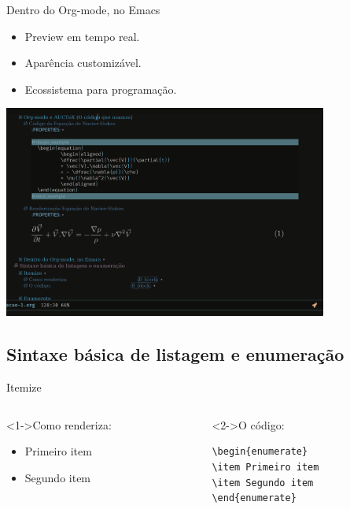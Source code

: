 \documentclass[bigger]{beamer}
\begin{document}
{\begin{frame}[label={sec:org5e3622c}]{Dentro do Org-mode, no Emacs}
\begin{itemize}[<+->]
\item Preview em tempo real.
\item Aparência customizável.
\item Ecossistema para programação.
\end{itemize}

\href{img/orgmode-auctex.png}{\includegraphics[center,width=0.8\textwidth]{./img/orgmode-auctex2.png}}
\end{frame}

\subsection{Sintaxe básica de listagem e enumeração}
\label{sec:orgcd6e5dd}
\begin{frame}[label={sec:org092b07c},fragile]{Itemize}
 \begin{columns}
\begin{column}{0.48\columnwidth}
\begin{block}<1->{Como renderiza:}
\begin{itemize}
\item Primeiro item
\item Segundo item
\end{itemize}
\end{block}
\end{column}

\begin{column}{0.48\columnwidth}
\begin{block}<2->{O código:}
\begin{verbatim}
\begin{enumerate}
\item Primeiro item
\item Segundo item
\end{enumerate}
\end{verbatim}
\end{block}
\end{column}
\end{columns}
\end{frame}

}
\end{document}
